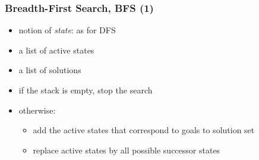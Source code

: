 \begin{frame}[fragile]\frametitle{Breadth-First Search, BFS (1)}


  
\begin{itemize}
\item notion of \emph{state}: as for DFS
\item a list of active states
\item a list of solutions
\end{itemize}

\begin{itemize}
\item if the stack is empty, stop the search
\item otherwise:
  \begin{itemize}

  \item add the active states that correspond to goals to solution set
  \item replace active states by all possible successor states
  \end{itemize}
\end{itemize}

\end{frame}



